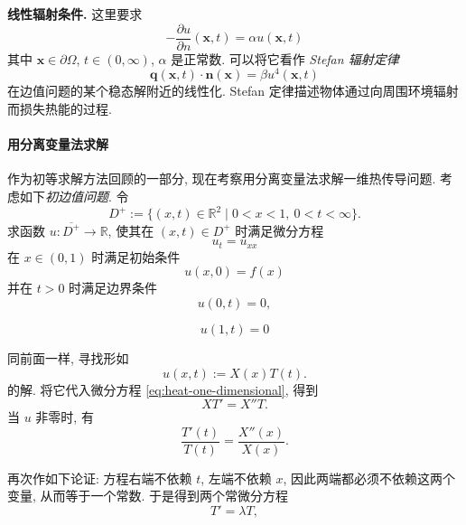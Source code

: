 \textbf{线性辐射条件.} 这里要求
\begin{equation}\label{eq:linear-radiation-boundary}
-\dfrac{\partial u}{\partial n}(\bm{x},t)=\alpha u(\bm{x},t)
\end{equation}
其中 $\bm{x}\in\partial\Omega$, $t\in(0,\infty)$, $\alpha$ 是正常数. 可以将它看作 \emph{Stefan 辐射定律}
\begin{equation}\label{eq:stefan-radiation-law}
\bm{q}(\bm{x},t)\cdot\bm{n}(\bm{x})=\beta u^4(\bm{x},t)
\end{equation}
在边值问题的某个稳态解附近的线性化. Stefan 定律描述物体通过向周围环境辐射而损失热能的过程.

\paragraph*{用分离变量法求解}

作为初等求解方法回顾的一部分, 现在考察用分离变量法求解一维热传导问题. 考虑如下\emph{初边值问题}. 令
\[
D^+:=\{(x,t)\in\mathbb{R}^2\mid 0<x<1,\ 0<t<\infty\}.
\]
求函数 $u:\overline{D^+}\to\mathbb{R}$, 使其在 $(x,t)\in D^+$ 时满足微分方程
\begin{equation}\label{eq:heat-one-dimensional}
u_t=u_{xx}
\end{equation}
在 $x\in(0,1)$ 时满足初始条件
\begin{equation}\label{eq:heat-interval-initial}
u(x,0)=f(x)
\end{equation}
并在 $t>0$ 时满足边界条件
\begin{equation}\label{eq:heat-left-boundary}
u(0,t)=0,
\end{equation}

\begin{equation}\label{eq:heat-right-boundary}
u(1,t)=0
\end{equation}


同前面一样, 寻找形如
\begin{equation}\label{eq:heat-separated-product}
u(x,t):=X(x)T(t).
\end{equation}
的解. 将它代入微分方程 \eqref{eq:heat-one-dimensional}, 得到
\begin{equation}\label{eq:heat-product-substitution}
XT'=X''T.
\end{equation}
当 $u$ 非零时, 有
\begin{equation}\label{eq:heat-separated-ratios}
\dfrac{T'(t)}{T(t)}=\dfrac{X''(x)}{X(x)}.
\end{equation}


再次作如下论证: 方程右端不依赖 $t$, 左端不依赖 $x$, 因此两端都必须不依赖这两个变量, 从而等于一个常数. 于是得到两个常微分方程
\begin{equation}\label{eq:heat-separated-time-equation}
T'=\lambda T,
\end{equation}


